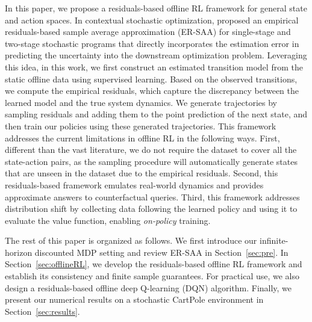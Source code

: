 \documentclass[letterpaper, 10 pt, conference]{ieeeconf}  %
\begin{document}

In this paper, we propose a residuals-based offline RL framework for general state and action spaces. In contextual stochastic optimization, \cite{kannan2025data} proposed an empirical residuals-based sample average approximation (ER-SAA) for single-stage and two-stage stochastic programs that directly incorporates the estimation error in predicting the uncertainty into the downstream optimization problem.
Leveraging this idea, in this work, we first construct an estimated transition model from the static offline data using supervised learning. Based on the observed transitions, we compute the empirical residuals, which capture the discrepancy between the learned model and the true system dynamics. We generate trajectories by sampling residuals and adding them to the point prediction of the next state, and then train our policies using these generated trajectories. This framework addresses the current limitations in offline RL in the following ways. First, different than the vast literature, we do not require the dataset to cover all the state-action pairs, as the sampling procedure will automatically generate states that are unseen in the dataset due to the empirical residuals. Second, this residuals-based framework emulates real-world dynamics and provides approximate answers to counterfactual queries. Third, this framework addresses distribution shift by collecting data following the learned policy and using it to evaluate the value function, enabling \textit{on-policy} training.

The rest of this paper is organized as follows. We first introduce our infinite-horizon discounted MDP setting and review ER-SAA in Section~\ref{sec:pre}. In Section~\ref{sec:offlineRL}, we develop the residuals-based offline RL framework and establish its consistency and finite sample guarantees. For practical use, we also design a residuals-based offline deep Q-learning (DQN) algorithm. Finally, we present our numerical results on a stochastic CartPole environment in Section~\ref{sec:results}.
\end{document}
